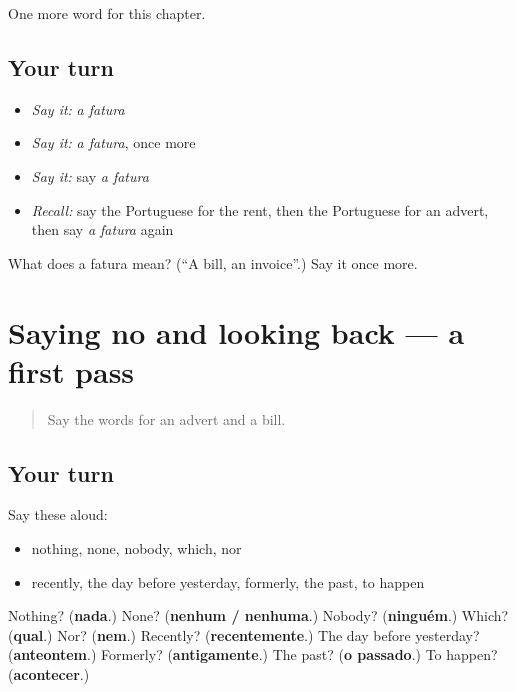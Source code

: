\begin{grammarlens}[title={What you've built}]
One more word for this chapter.
\end{grammarlens}

\subsection*{Your turn}
\begin{itemize}
\raggedright
  \item \emph{Say it:} \emph{a fatura}
  \item \emph{Say it:} \emph{a fatura}, once more
  \item \emph{Say it:} say \emph{a fatura}
  \item \emph{Recall:} say the Portuguese for the rent, then the Portuguese for an advert, then say \emph{a fatura} again
\end{itemize}

\begin{tcolorbox}[breakable,colback=teal!4,colframe=teal!35!black,title={Before you move on}]
What does a fatura mean? (\textquotedblleft{}A bill, an invoice\textquotedblright{}.) Say it once more.
\end{tcolorbox}
\section[(dialogue)]{Saying no and looking back — a first pass}

\label{lesson:PT-R137-first-pass-saying-no-and-looking-back}



\begin{quote}
Say the words for an advert and a bill.
\end{quote}

\subsection*{Your turn}
Say these aloud:

\begin{itemize}
\raggedright
  \item nothing, none, nobody, which, nor
  \item recently, the day before yesterday, formerly, the past, to happen
\end{itemize}

\begin{tcolorbox}[breakable,colback=teal!4,colframe=teal!35!black,title={Before you move on}]
Nothing? (\textbf{nada}.) None? (\textbf{nenhum / nenhuma}.) Nobody? (\textbf{ninguém}.) Which? (\textbf{qual}.) Nor? (\textbf{nem}.) Recently? (\textbf{recentemente}.) The day before yesterday? (\textbf{anteontem}.) Formerly? (\textbf{antigamente}.) The past? (\textbf{o passado}.) To happen? (\textbf{acontecer}.)
\end{tcolorbox}

